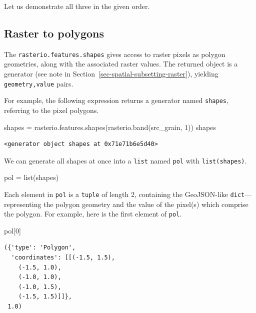 \documentclass[
  letterpaper,
]{krantz}
\newenvironment{Shaded}{\begin{snugshade}}{\end{snugshade}}
\newcommand{\BuiltInTok}[1]{\textcolor[rgb]{0.00,0.23,0.31}{#1}}
\newcommand{\DecValTok}[1]{\textcolor[rgb]{0.68,0.00,0.00}{#1}}
\newcommand{\NormalTok}[1]{\textcolor[rgb]{0.00,0.23,0.31}{#1}}
\newcommand{\OperatorTok}[1]{\textcolor[rgb]{0.37,0.37,0.37}{#1}}
\begin{document}
Let us demonstrate all three in the given order.

\subsection{Raster to polygons}\label{sec-raster-to-polygons}

The \texttt{rasterio.features.shapes} gives access to raster pixels as
polygon geometries, along with the associated raster values. The
returned object is a generator (see note in
Section~\ref{sec-spatial-subsetting-raster}), yielding
\texttt{geometry,value} pairs.

For example, the following expression returns a generator named
\texttt{shapes}, referring to the pixel polygons.

\begin{Shaded}
\begin{Highlighting}[]
\NormalTok{shapes }\OperatorTok{=}\NormalTok{ rasterio.features.shapes(rasterio.band(src\_grain, }\DecValTok{1}\NormalTok{))}
\NormalTok{shapes}
\end{Highlighting}
\end{Shaded}

\begin{verbatim}
<generator object shapes at 0x71e71b6e5d40>
\end{verbatim}

We can generate all shapes at once into a \texttt{list} named
\texttt{pol} with \texttt{list(shapes)}.

\begin{Shaded}
\begin{Highlighting}[]
\NormalTok{pol }\OperatorTok{=} \BuiltInTok{list}\NormalTok{(shapes)}
\end{Highlighting}
\end{Shaded}

Each element in \texttt{pol} is a \texttt{tuple} of length 2, containing
the GeoJSON-like \texttt{dict}---representing the polygon geometry and
the value of the pixel(s) which comprise the polygon. For example, here
is the first element of \texttt{pol}.

\begin{Shaded}
\begin{Highlighting}[]
\NormalTok{pol[}\DecValTok{0}\NormalTok{]}
\end{Highlighting}
\end{Shaded}

\begin{verbatim}
({'type': 'Polygon',
  'coordinates': [[(-1.5, 1.5),
    (-1.5, 1.0),
    (-1.0, 1.0),
    (-1.0, 1.5),
    (-1.5, 1.5)]]},
 1.0)
\end{verbatim}
\end{document}
